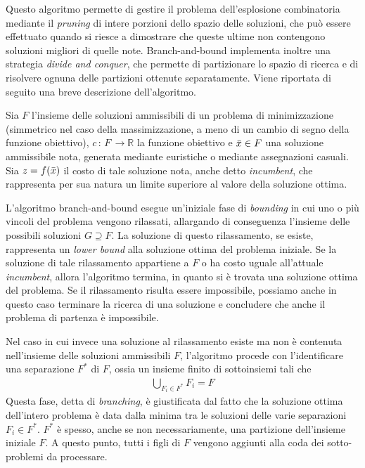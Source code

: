 Questo algoritmo permette di gestire il problema dell'esplosione combinatoria mediante il \textit{pruning} di intere porzioni dello spazio delle soluzioni, che può essere effettuato quando si riesce a dimostrare che queste ultime non contengono soluzioni migliori di 
quelle note. Branch-and-bound implementa inoltre una strategia \textit{divide and conquer}, che permette di partizionare lo spazio di 
ricerca e di risolvere ognuna delle partizioni ottenute separatamente. Viene riportata di seguito una breve descrizione dell'algoritmo.

Sia $F$ l'insieme delle soluzioni ammissibili di un problema di minimizzazione (simmetrico nel caso della massimizzazione, a meno di un 
cambio di segno della funzione obiettivo), $c \, : \, F \, \rightarrow \mathbb{R} $ la funzione obiettivo e $\Bar{x} \in F$ una 
soluzione ammissibile nota, generata mediante euristiche o mediante assegnazioni casuali. Sia $z=f(\Bar{x})$ il costo di tale soluzione
nota, anche detto \textit{incumbent}, che rappresenta per sua natura un limite superiore al valore della soluzione ottima. 

L'algoritmo branch-and-bound esegue un'iniziale fase di \textit{bounding} in cui uno o più vincoli del problema vengono rilassati, allargando di conseguenza l'insieme delle possibili soluzioni $G \supseteq F$. La soluzione di questo rilassamento, se esiste,
rappresenta un \textit{lower bound} alla soluzione ottima del problema iniziale. Se la soluzione di tale rilassamento appartiene a $F$
o ha costo uguale all'attuale \textit{incumbent}, allora l'algoritmo termina, in quanto si è trovata una soluzione ottima del problema.
Se il rilassamento risulta essere impossibile, possiamo anche in questo caso terminare la ricerca di una soluzione e 
concludere che anche il problema di partenza è impossibile.

Nel caso in cui invece una soluzione al rilassamento esiste ma non è contenuta nell'insieme delle soluzioni ammissibili $F$,
l'algoritmo procede con l'identificare una separazione $F^*$ di $F$, ossia un insieme finito di sottoinsiemi tali che
\begin{align*}
\bigcup_{F_i \in F^*} F_{i} = F
\end{align*}
Questa fase, detta di \textit{branching}, è giustificata dal fatto che la soluzione ottima dell'intero problema è data dalla minima
tra le soluzioni delle varie separazioni $F_i \in F^*$. $F^*$ è spesso, anche se non necessariamente, una partizione dell'insieme 
iniziale $F$. A questo punto, tutti i figli di $F$ vengono aggiunti alla coda dei sotto-problemi da processare.

